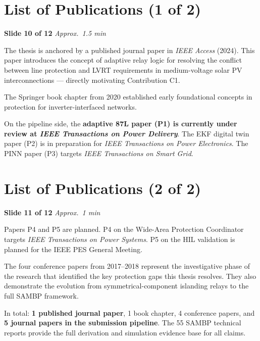 \documentclass[12pt, a4paper]{article}
\newenvironment{notebox}{%
  \begin{tcolorbox}[
    colback=noteBg,
    colframe=iitmMaroon!40,
    boxrule=0.6pt,
    arc=3pt,
    left=8pt, right=8pt, top=6pt, bottom=6pt
  ]
  \setstretch{1.4}\small
}{%
  \end{tcolorbox}
}
\newcommand{\slidetag}[2]{%
  \noindent
  \textcolor{slideNum}{\footnotesize\bfseries Slide #1} \hfill
  \textcolor{iitmGold!80!black}{\footnotesize\itshape Approx.\ #2}\\[2pt]
}
\begin{document}
\section{List of Publications (1 of 2)}

\slidetag{10 of 12}{1.5 min}
\begin{notebox}
The thesis is anchored by a published journal paper in \textit{IEEE Access} (2024).
This paper introduces the concept of adaptive relay logic for resolving the conflict
between line protection and LVRT requirements in medium-voltage solar PV
interconnections --- directly motivating Contribution C1.

The Springer book chapter from 2020 established early foundational concepts in
protection for inverter-interfaced networks.

On the pipeline side, the \textbf{adaptive 87L paper (P1) is currently under review at
\textit{IEEE Transactions on Power Delivery}}. The EKF digital twin paper (P2) is in
preparation for \textit{IEEE Transactions on Power Electronics}. The PINN paper (P3)
targets \textit{IEEE Transactions on Smart Grid}.
\end{notebox}

\section{List of Publications (2 of 2)}

\slidetag{11 of 12}{1 min}
\begin{notebox}
Papers P4 and P5 are planned. P4 on the Wide-Area Protection Coordinator targets
\textit{IEEE Transactions on Power Systems}. P5 on the HIL validation is planned for
the IEEE PES General Meeting.

The four conference papers from 2017--2018 represent the investigative phase of the
research that identified the key protection gaps this thesis resolves. They also
demonstrate the evolution from symmetrical-component islanding relays to the full
SAMBP framework.

In total: \textbf{1 published journal paper}, 1 book chapter, 4 conference papers, and
\textbf{5 journal papers in the submission pipeline}. The 55 SAMBP technical reports
provide the full derivation and simulation evidence base for all claims.
\end{notebox}

\end{document}
